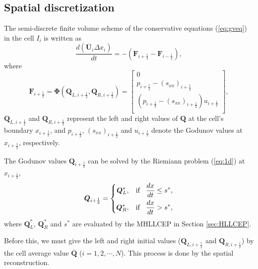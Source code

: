 \documentclass{article}
\numberwithin{equation}{section}
\numberwithin{table}{section}
\begin{document}
\subsection{Spatial discretization}
The  semi-discrete finite volume scheme of the conservative equations (\ref{eq:gveq}) in the cell $I_i$ is written as
\begin{equation}\label{eq:sem}
  \frac{d(\overline{\bm{U}}_i\Delta x_i)}{dt} = -(\bm{F}_{i+\frac{1}{2}} - \bm{F}_{i-\frac{1}{2}}),
\end{equation}
where
\begin{equation}
  \bm{F}_{i+\frac{1}{2}} = \bm{\Phi} (\bm{Q}_{L,i+\frac{1}{2}}, \bm{Q}_{R,i+\frac{1}{2}})  = \left[
	\begin{array}{l}
	  0\\
	  p_{i+\frac{1}{2}} - (s_{xx})_{i+\frac{1}{2}}\\
	  (p_{i+\frac{1}{2}} - (s_{xx})_{i+\frac{1}{2}})u_{i+\frac{1}{2}}\\
	\end{array}
  \right],
\end{equation}
$\bm{Q}_{L,i+\frac{1}{2}}$ and $\bm{Q}_{R,i+\frac{1}{2}}$ represent the left and right values of $\bm{Q}$ at the cell's boundary $x_{i+\frac{1}{2}}$, and  $p_{i+\frac{1}{2}}$, $(s_{xx})_{i+\frac{1}{2}}$ and $u_{i+\frac{1}{2}}$ denote the Godunov values at $x_{i+\frac{1}{2}}$, respectively.

The Godunov values  $\bm{Q}_{i+\frac{1}{2}}$  can be solved  by the Riemiann problem  (\ref{eq:1d}) at $x_{i+\frac{1}{2}}$,
\begin{equation}\label{eq:qLR}
  \bm{Q}_{i+\frac{1}{2}} = \left\{ \begin{aligned}
	\bm{Q}_L^*, \hspace{0.3cm} \text{if} \hspace{0.3cm} \frac{dx}{dt} \le  s^*,\\
	\bm{Q}_R^*, \hspace{0.3cm} \text{if} \hspace{0.3cm} \frac{dx}{dt} > s^*,\\
  \end{aligned} \right.
\end{equation}
where $\bm{Q}_L^*$, $\bm{Q}_R^*$ and $s^*$ are evaluated by the MHLLCEP in Section \ref{sec:HLLCEP}.

Before this, we must give the left  and right initial values ($\bm{Q}_{L,i+\frac{1}{2}}$ and $\bm{Q}_{R,i+\frac{1}{2}}$) by the cell average value $\overline{\bm{Q}}$ ($i = 1,2,\cdots,N$). This process is done by the spatial reconstruction.
\end{document}
